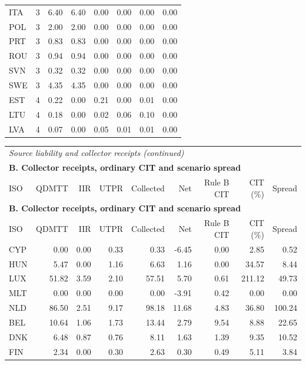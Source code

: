 {\begin{longtable}{@{}lrrrrrrr@{}}
ITA & 3 &  6.40 &  6.40 & 0.00 & 0.00 & 0.00 & 0.00 \\
POL & 3 &  2.00 &  2.00 & 0.00 & 0.00 & 0.00 & 0.00 \\
PRT & 3 &  0.83 &  0.83 & 0.00 & 0.00 & 0.00 & 0.00 \\
ROU & 3 &  0.94 &  0.94 & 0.00 & 0.00 & 0.00 & 0.00 \\
SVN & 3 &  0.32 &  0.32 & 0.00 & 0.00 & 0.00 & 0.00 \\
SWE & 3 &  4.35 &  4.35 & 0.00 & 0.00 & 0.00 & 0.00 \\
EST & 4 &  0.22 &  0.00 & 0.21 & 0.00 & 0.01 & 0.00 \\
LTU & 4 &  0.18 &  0.00 & 0.02 & 0.06 & 0.10 & 0.00 \\
LVA & 4 &  0.07 &  0.00 & 0.05 & 0.01 & 0.01 & 0.00 \\
\end{longtable}
\addtocounter{table}{-1}
\begin{longtable}{@{}lrrrrrrrr@{}}
\multicolumn{9}{l}{\textit{Source liability and collector receipts (continued)}} \\
\multicolumn{9}{l}{\textbf{B. Collector receipts, ordinary CIT and scenario spread}} \\
\toprule
ISO & QDMTT & IIR & UTPR & Collected & Net & Rule B CIT & CIT (\%) & Spread \\
\midrule
\endfirsthead
\multicolumn{9}{l}{\textbf{B. Collector receipts, ordinary CIT and scenario spread}} \\
\toprule
ISO & QDMTT & IIR & UTPR & Collected & Net & Rule B CIT & CIT (\%) & Spread \\
\midrule
\endhead
\midrule
\endfoot
\bottomrule
\endlastfoot
CYP &  0.00 &  0.00 &  0.33 &  0.33 & -6.45 &  0.00 &   2.85 &   0.52 \\
HUN &  5.47 &  0.00 &  1.16 &  6.63 &  1.16 &  0.00 &  34.57 &   8.44 \\
LUX & 51.82 &  3.59 &  2.10 & 57.51 &  5.70 &  0.61 & 211.12 &  49.73 \\
MLT &  0.00 &  0.00 &  0.00 &  0.00 & -3.91 &  0.42 &   0.00 &   0.00 \\
NLD & 86.50 &  2.51 &  9.17 & 98.18 & 11.68 &  4.83 &  36.80 & 100.24 \\
BEL & 10.64 &  1.06 &  1.73 & 13.44 &  2.79 &  9.54 &   8.88 &  22.65 \\
DNK &  6.48 &  0.87 &  0.76 &  8.11 &  1.63 &  1.39 &   9.35 &  10.52 \\
FIN &  2.34 &  0.00 &  0.30 &  2.63 &  0.30 &  0.49 &   5.11 &   3.84 \\

\end{longtable}}
